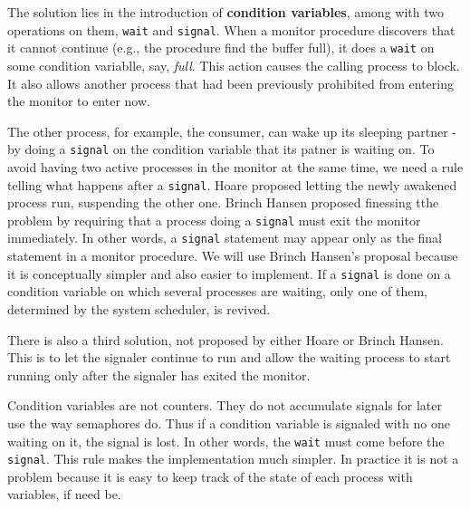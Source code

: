 \documentclass{book}
\newcommand {\kw}  [1] {\textbf{#1}}
\newcommand {\sys} [1] {\textsl{#1}}
\newcommand {\cmd} [1] {\texttt{#1}}
\begin{document}
The solution lies in the introduction of \kw{condition variables}, among with two operations on them, \cmd{wait} and \cmd{signal}.
When a monitor procedure discovers that it cannot continue (e.g., the procedure find the buffer full),
it does a \cmd{wait} on some condition variablle, say, \sys{full}.
This action causes the calling process to block.
It also allows another process that had been previously prohibited from entering the monitor to enter now.

The other process, for example, the consumer, can wake up its sleeping partner - 
by doing a \cmd{signal} on the condition variable that its patner is waiting on.
To avoid having two active processes in the monitor at the same time, we need a rule telling what happens after a \cmd{signal}.
Hoare proposed letting the newly awakened process run, suspending the other one.
Brinch Hansen proposed finessing tthe problem by requiring that a process doing a \cmd{signal} must exit the monitor immediately.
In other words, a \cmd{signal} statement may appear only as the final statement in a monitor procedure.
We will use Brinch Hansen's proposal because it is conceptually simpler and also easier to implement.
If a \cmd{signal} is done on a condition variable on which several processes are waiting, 
only one of them, determined by the system scheduler, is revived.

There is also a third solution, not proposed by either Hoare or Brinch Hansen.
This is to let the signaler continue to run and allow the waiting process to start running only after the signaler has exited the monitor.

Condition variables are not counters.
They do not accumulate signals for later use the way semaphores do.
Thus if a condition variable is signaled with no one waiting on it, the signal is lost.
In other words, the \cmd{wait} must come before the \cmd{signal}.
This rule makes the implementation much simpler.
In practice it is not a problem because it is easy to keep track of the state of each process with variables, if need be.





























\end{document}
